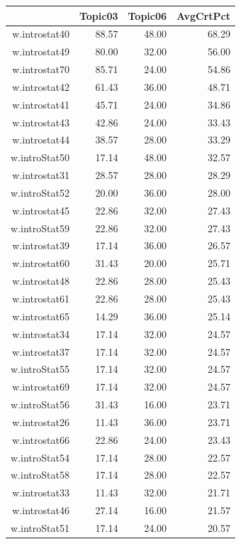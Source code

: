 \documentclass[12pt,nohyper]{tufte-handout}\usepackage[]{graphicx}\usepackage[]{color}
\begin{document}
\begin{longtable}{rrrr}
  \hline
 & Topic03 & Topic06 & AvgCrtPct \\ 
  \hline
w.introstat40 & 88.57 & 48.00 & 68.29 \\ 
  w.introstat49 & 80.00 & 32.00 & 56.00 \\ 
  w.introstat70 & 85.71 & 24.00 & 54.86 \\ 
  w.introstat42 & 61.43 & 36.00 & 48.71 \\ 
  w.introstat41 & 45.71 & 24.00 & 34.86 \\ 
  w.introstat43 & 42.86 & 24.00 & 33.43 \\ 
  w.introstat44 & 38.57 & 28.00 & 33.29 \\ 
  w.introStat50 & 17.14 & 48.00 & 32.57 \\ 
  w.introstat31 & 28.57 & 28.00 & 28.29 \\ 
  w.introStat52 & 20.00 & 36.00 & 28.00 \\ 
  w.introstat45 & 22.86 & 32.00 & 27.43 \\ 
  w.introStat59 & 22.86 & 32.00 & 27.43 \\ 
  w.introstat39 & 17.14 & 36.00 & 26.57 \\ 
  w.introstat60 & 31.43 & 20.00 & 25.71 \\ 
  w.introstat48 & 22.86 & 28.00 & 25.43 \\ 
  w.introstat61 & 22.86 & 28.00 & 25.43 \\ 
  w.introstat65 & 14.29 & 36.00 & 25.14 \\ 
  w.introstat34 & 17.14 & 32.00 & 24.57 \\ 
  w.introstat37 & 17.14 & 32.00 & 24.57 \\ 
  w.introStat55 & 17.14 & 32.00 & 24.57 \\ 
  w.introstat69 & 17.14 & 32.00 & 24.57 \\ 
  w.introStat56 & 31.43 & 16.00 & 23.71 \\ 
  w.introstat26 & 11.43 & 36.00 & 23.71 \\ 
  w.introstat66 & 22.86 & 24.00 & 23.43 \\ 
  w.introStat54 & 17.14 & 28.00 & 22.57 \\ 
  w.introStat58 & 17.14 & 28.00 & 22.57 \\ 
  w.introstat33 & 11.43 & 32.00 & 21.71 \\ 
  w.introstat46 & 27.14 & 16.00 & 21.57 \\ 
  w.introStat51 & 17.14 & 24.00 & 20.57 \\ 

\end{longtable}
\end{document}
